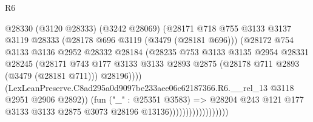 \begin{lexlean}{R6}
\begin{coremodule}
                                      @28330
                                        (@3120 @28333)
                                        (@3242 @28069)
                                        (@28171
                                          @718
                                          @755
                                          @3133
                                          @3137
                                          @3119
                                          @28333
                                          (@28178 @696 @3119 (@3479 (@28181 @696)))
                                          (@28172
                                            @754
                                            @3133
                                            @3136
                                            @2952
                                            @28332
                                            @28184
                                            (@28235
                                              @753
                                              @3133
                                              @3135
                                              @2954
                                              @28331
                                              @28245
                                              (@28171
                                                @743
                                                @177
                                                @3133
                                                @3133
                                                @2893
                                                @2875
                                                (@28178 @711 @2893 (@3479 (@28181 @711)))
                                                @28196))))
                                        (LexLeanPreserve.C8ad295a0d9097be233aee06c62187366.R6.__rel_13
                                          @3118
                                          @2951
                                          @2906
                                          @2892))
                                      (fun ("_" : @25351 @3583) =>
                                      @28204
                                        @243
                                        @121
                                        @177
                                        @3133
                                        @3133
                                        @2875
                                        @3073
                                        @28196
                                        @13136))))))))))))))))))

\end{coremodule}
\end{lexlean}
